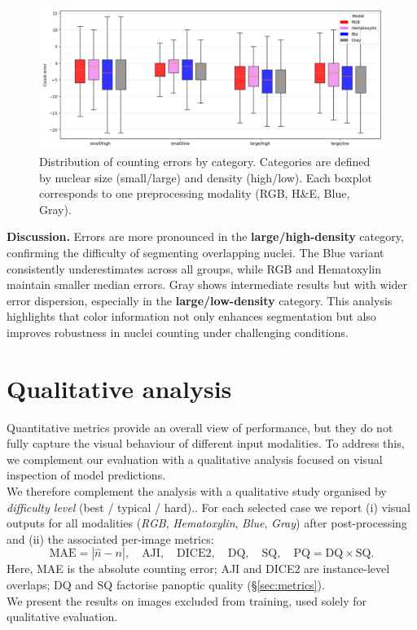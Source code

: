 \documentclass[target=bach,aauheader=,style=]{thud}
\begin{document}
\begin{figure}[h]
    \centering
    \includegraphics[width=\textwidth]{imgs/boxplot.png}
    \caption{Distribution of counting errors by category. Categories are defined by nuclear size (small/large) and density (high/low). Each boxplot corresponds to one preprocessing modality (RGB, H\&E, Blue, Gray).}
    \label{fig:boxplot_categories}
\end{figure}

\noindent\textbf{Discussion.} 
Errors are more pronounced in the \textbf{large/high-density} category, confirming the difficulty of segmenting overlapping nuclei. 
The Blue variant consistently underestimates across all groups, while RGB and Hematoxylin maintain smaller median errors. 
Gray shows intermediate results but with wider error dispersion, especially in the \textbf{large/low-density} category. 
This analysis highlights that color information not only enhances segmentation but also improves robustness in nuclei counting under challenging conditions.
\section{Qualitative analysis}
\label{sec:qualitative}

Quantitative metrics provide an overall view of performance, but they do not fully capture the visual behaviour of different input modalities. To address this, we complement our evaluation with a qualitative analysis focused on visual inspection of model predictions.\\
We therefore complement the analysis with a qualitative study organised by \emph{difficulty level} (best / typical / hard).. 
For each selected case we report (i) visual outputs for all modalities (\emph{RGB}, \emph{Hematoxylin}, \emph{Blue}, \emph{Gray}) after post-processing and (ii) the associated per-image metrics:
\[
\text{MAE} = |\hat{n}-n|,\quad
\text{AJI},\quad
\text{DICE2},\quad
\text{DQ},\quad
\text{SQ},\quad
\text{PQ}=\text{DQ}\times\text{SQ}.
\]
Here, MAE is the absolute counting error; AJI and DICE2 are instance-level overlaps; DQ and SQ factorise panoptic quality (\S\ref{sec:metrics}).\\
We present the results on images excluded from training, used solely for qualitative evaluation.
\end{document}
